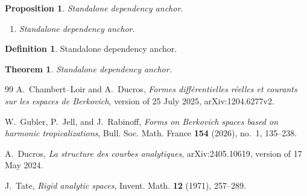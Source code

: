 \documentclass[11pt]{article}
\newtheorem{proposition}[lemma]{Proposition}
\newtheorem{theorem}[lemma]{Theorem}
\theoremstyle{definition}
\newtheorem{definition}[lemma]{Definition}
\theoremstyle{remark}
\begin{document}





\begin{proposition}
\label{prop:ch13-pullback-properties}
Standalone dependency anchor.
\begin{enumerate}
\item\label{itm:ch13-pb:red}Standalone dependency anchor.
\end{enumerate}
\end{proposition}
\begin{definition}
\label{def:ch16-psh-filtration}
Standalone dependency anchor.
\end{definition}
\begin{theorem}
\label{thm:current-fundamental-cycle}
Standalone dependency anchor.
\end{theorem}




\begin{thebibliography}{99}
A.~Chambert--Loir and A.~Ducros,
\emph{Formes diff\'erentielles r\'eelles et courants sur les espaces de
Berkovich}, version of 25 July 2025, arXiv:1204.6277v2.

W.~Gubler, P.~Jell, and J.~Rabinoff,
\emph{Forms on Berkovich spaces based on harmonic tropicalizations},
Bull. Soc. Math. France \textbf{154} (2026), no.~1, 135--238.

A.~Ducros,
\emph{La structure des courbes analytiques},
arXiv:2405.10619, version of 17 May 2024.

J.~Tate,
\emph{Rigid analytic spaces},
Invent. Math. \textbf{12} (1971), 257--289.
\end{thebibliography}
\end{document}
